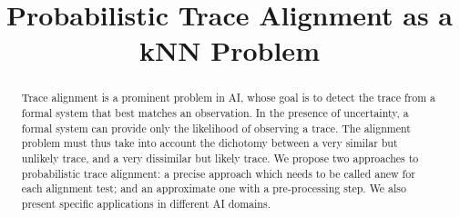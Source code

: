 \documentclass{article}
\title{Probabilistic Trace Alignment as a kNN Problem}
\date{\vspace{-5em}}
\begin{document}
\maketitle

\begin{abstract}
Trace alignment is a prominent problem in AI, whose goal is to detect the trace from a formal 
system that best matches an observation. In the presence of uncertainty, a
formal system can provide only the likelihood of observing a trace. The alignment problem must thus take into account 
the dichotomy between a very similar but unlikely trace, and a very
dissimilar but likely trace. We propose two approaches to probabilistic trace alignment: a precise approach which
needs to be called anew for each alignment test; and an approximate one with a pre-processing step. We also present
specific applications in different AI domains.
\end{abstract}











\clearpage



\newpage

\end{document}
